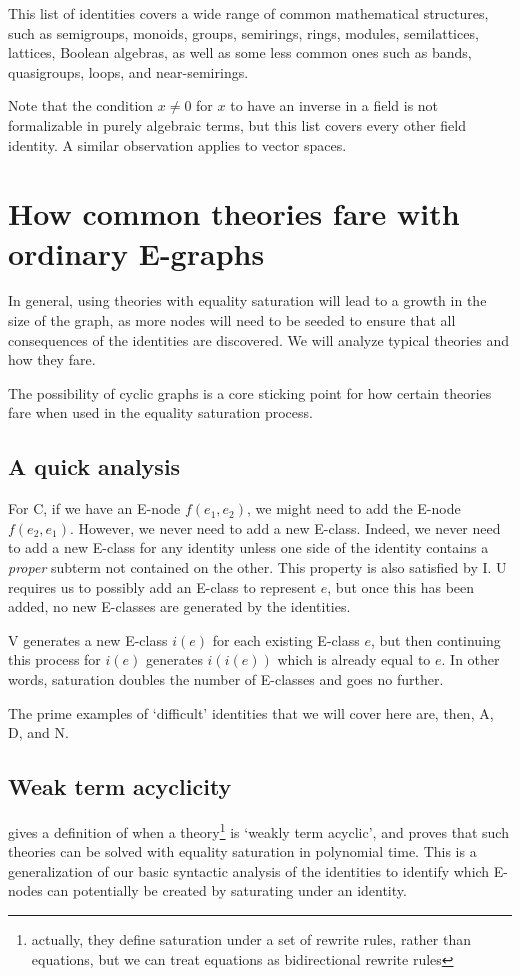\documentclass[12pt,a4paper,twoside,openright]{report}
\numberwithin{equation}{chapter}		%
\numberwithin{figure}{chapter}			%
\numberwithin{table}{chapter}			%
\theoremstyle{definition}
\theoremstyle{plain}
\begin{document}

This list of identities covers a wide range of common mathematical structures, such as semigroups, monoids, groups, semirings, rings, modules, semilattices, lattices, Boolean algebras, as well as some less common ones such as bands, quasigroups, loops, and near-semirings.

Note that the condition $x \neq 0$ for $x$ to have an inverse in a field is not formalizable in purely algebraic terms, but this list covers every other field identity. A similar observation applies to vector spaces.

\section{How common theories fare with ordinary E-graphs} \label{howfare}
In general, using theories with equality saturation will lead to a growth in the size of the graph, as more nodes will need to be seeded to ensure that all consequences of the identities are discovered. We will analyze typical theories and how they fare.

The possibility of cyclic graphs is a core sticking point for how certain theories fare when used in the equality saturation process.

\subsection{A quick analysis}
For C, if we have an E-node $f(e_1, e_2)$, we might need to add the E-node $f(e_2, e_1)$. However, we never need to add a new E-class. Indeed, we never need to add a new E-class for any identity unless one side of the identity contains a \emph{proper} subterm not contained on the other. This property is also satisfied by I. U requires us to possibly add an E-class to represent $e$, but once this has been added, no new E-classes are generated by the identities.

V generates a new E-class $i(e)$ for each existing E-class $e$, but then continuing this process for $i(e)$ generates $i(i(e))$ which is already equal to $e$. In other words, saturation doubles the number of E-classes and goes no further.

The prime examples of `difficult' identities that we will cover here are, then, A, D, and N.

\subsection{Weak term acyclicity} \label{weaktermacyclicity}
\citep{suciu_semantic_2025} gives a definition of when a theory\footnote{actually, they define saturation under a set of rewrite rules, rather than equations, but we can treat equations as bidirectional rewrite rules} is `weakly term acyclic', and proves that such theories can be solved with equality saturation in polynomial time. This is a generalization of our basic syntactic analysis of the identities to identify which E-nodes can potentially be created by saturating under an identity.
\end{document}
